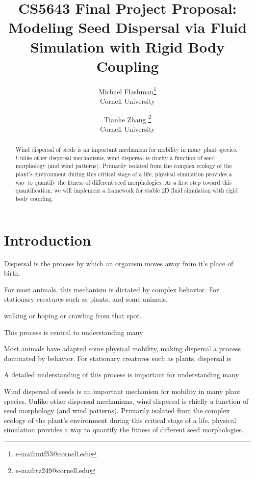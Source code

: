 \documentclass[annual]{acmsiggraph}
\title{CS5643 Final Project Proposal: \\ Modeling Seed Dispersal via Fluid Simulation with Rigid Body Coupling}
\author{Michael Flashman\thanks{e-mail:mtf53@cornell.edu}\\Cornell University \and Tianhe Zhang \thanks{e-mail:tz249@cornell.edu}\\Cornell University}
\begin{document}
\maketitle

\begin{abstract}
Wind dispersal of  seeds is an important mechanism for mobility in many plant species.  Unlike other dispersal mechanisms, wind dispersal is chiefly a function of seed morphology (and wind patterns).  Primarily isolated from the  complex ecology of the plant's environment during this critical stage of a life, physical simulation provides a way to  quantify the fitness of different seed morphologies.   As a first step toward this quantification, we will implement a  framework for stable 2D fluid simulation with rigid body coupling.
\end{abstract}





\keywordlist

\copyrightspace

\section{Introduction}

Dispersal is the process by which an organism moves away from it's place of birth.    


For most animals, this mechanism is dictated by complex behavior.  For stationary creatures such as plants, and some animals, 

 walking or hoping or crawling from that spot.  

This process is central to understanding many 

Most animals have adapted some physical mobility, making dispersal a process dominated by behavior.  For stationary creatures such as plants, dispersal is  


A detailed understanding of this process is important for understanding many 

\cite{wang2012}


Wind dispersal of  seeds is an important mechanism for mobility in many plant species.  Unlike other dispersal mechanisms, wind dispersal is chiefly a function of seed morphology (and wind patterns).  Primarily isolated from the  complex ecology of the plant's environment during this critical stage of a life, physical simulation provides a way to  quantify the fitness of different seed morphologies.   
\end{document}
